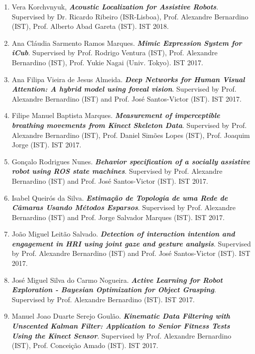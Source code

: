 \begin{enumerate}
  Rui Miguel Garcia Figueiredo. \emph{\textbf{Deep
  Recognition-by-tracking in a Robot Environment}}. Supervised by Prof.
  Alexandre Bernardino (IST) and Prof. José Santos-Victor (IST). IST
  2018.
\item
  Vera Korchvnyuk, \emph{\textbf{Acoustic Localization for Assistive
  Robots}}. Supervised by Dr. Ricardo Ribeiro (ISR-Lisboa), Prof.
  Alexandre Bernardino (IST), Prof. Alberto Abad Gareta (IST). IST 2018.
\item
  Ana Cláudia Sarmento Ramos Marques. \emph{\textbf{Mimic Expression
  System for iCub}}. Supervised by Prof. Rodrigo Ventura (IST), Prof.
  Alexandre Bernardino (IST), Prof. Yukie Nagai (Univ. Tokyo). IST 2017.
\item
  Ana Filipa Vieira de Jesus Almeida. \emph{\textbf{Deep Networks for
  Human Visual Attention: A hybrid model using foveal vision}}.
  Supervised by Prof. Alexandre Bernardino (IST) and Prof. José
  Santos-Victor (IST). IST 2017.
\item
  Filipe Manuel Baptista Marques. \emph{\textbf{Measurement of
  imperceptible breathing movements from Kinect Skeleton Data}}.
  Supervised by Prof. Alexandre Bernardino (IST), Prof. Daniel Simões
  Lopes (IST), Prof. Joaquim Jorge (IST). IST 2017.
\item
  Gonçalo Rodrigues Nunes. \emph{\textbf{Behavior specification of a
  socially assistive robot using ROS state machines}}. Supervised by
  Prof. Alexandre Bernardino (IST) and Prof. José Santos-Victor (IST).
  IST 2017.
\item
  Isabel Queirós da Silva. \emph{\textbf{Estimação de Topologia de uma
  Rede de Câmaras Usando Métodos Esparsos}}. Supervised by Prof.
  Alexandre Bernardino (IST) and Prof. Jorge Salvador Marques (IST). IST
  2017.
\item
  João Miguel Leitão Salvado. \emph{\textbf{Detection of interaction
  intention and engagement in HRI using joint gaze and gesture
  analysis}}. Supervised by Prof. Alexandre Bernardino (IST) and Prof.
  José Santos-Victor (IST). IST 2017.
\item
  José Miguel Silva do Carmo Nogueira. \emph{\textbf{Active Learning for
  Robot Exploration - Bayesian Optimization for Object Grasping}}.
  Supervised by Prof. Alexandre Bernardino (IST). IST 2017.
\item
  Manuel Joao Duarte Serejo Goulão. \emph{\textbf{Kinematic Data
  Filtering with Unscented Kalman Filter: Application to Senior Fitness
  Tests Using the Kinect Sensor}}. Supervised by Prof. Alexandre
  Bernardino (IST), Prof. Conceição Amado (IST). IST 2017.

\end{enumerate}
